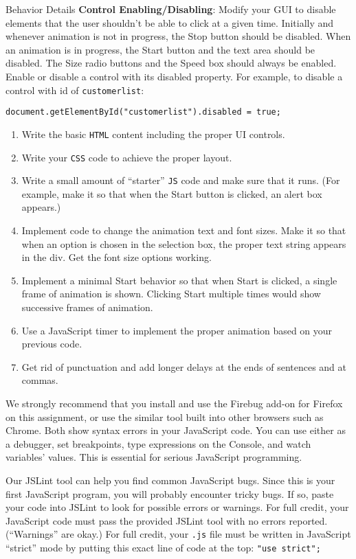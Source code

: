 \documentclass[programming]{../../mfcs}
\begin{document}
\begin{question}{Behavior Details}
\textbf{Control Enabling/Disabling}:
Modify your GUI to disable elements that the user shouldn't be able to click at a given time. Initially and whenever
animation is not in progress, the Stop button should be disabled. When an animation is in progress, the Start button
and the text area should be disabled. The Size radio buttons and the Speed box should always be enabled.
Enable or disable a control with its disabled property. For example, to disable a control with id of \texttt{customerlist}: 
\begin{center}\texttt{document.getElementById("customerlist").disabled = true;}\end{center}
  \begin{enumerate}[{1.}]
    \item Write the basic \texttt{HTML} content including the proper UI controls.
    \item Write your \texttt{CSS} code to achieve the proper layout.
    \item Write a small amount of ``starter'' \texttt{JS} code and make sure that it runs. (For example, make it so that when the Start button is clicked, an alert box appears.)
    \item Implement code to change the animation text and font sizes. Make it so that when an option is chosen in
the selection box, the proper text string appears in the div. Get the font size options working.
    \item Implement a minimal Start behavior so that when Start is clicked, a single frame of animation is shown.
Clicking Start multiple times would show successive frames of animation.
    \item Use a JavaScript timer to implement the proper animation based on your previous code.
    \item Get rid of punctuation and add longer delays at the ends of sentences and at commas.
  \end{enumerate}

We strongly recommend that you install and use the Firebug add-on for Firefox on this assignment, or use the
similar tool built into other browsers such as Chrome. Both show syntax errors in your JavaScript code. You can
use either as a debugger, set breakpoints, type expressions on the Console, and watch variables' values. This is
essential for serious JavaScript programming.
\newline

Our JSLint tool can help you find common JavaScript bugs. Since this is your first JavaScript program, you will
probably encounter tricky bugs. If so, paste your code into JSLint to look for possible errors or warnings. For full
credit, your JavaScript code must pass the provided JSLint tool with no errors reported. (``Warnings'' are okay.)
For full credit, your \texttt{.js} file must be written in JavaScript ``strict'' mode by putting this exact line of code at the top:
\texttt{"use strict";}
\end{question}
\end{document}
